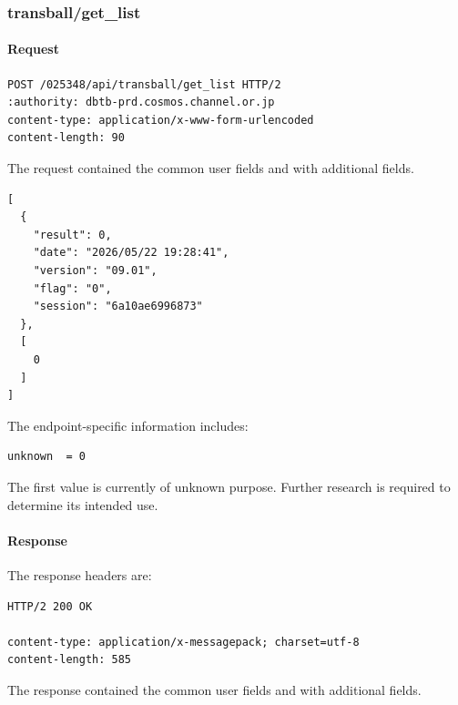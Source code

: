 \subsubsection{transball/get\_list}
\label{subsec:api_transball_get_list}

\paragraph{Request}

\begin{lstlisting}
POST /025348/api/transball/get_list HTTP/2
:authority: dbtb-prd.cosmos.channel.or.jp
content-type: application/x-www-form-urlencoded
content-length: 90
\end{lstlisting}

The request contained the common user fields and with additional fields.

\begin{lstlisting}
[
  {
    "result": 0,
    "date": "2026/05/22 19:28:41",
    "version": "09.01",
    "flag": "0",
    "session": "6a10ae6996873"
  },
  [
    0
  ]
]
\end{lstlisting}

The endpoint-specific information includes:

\begin{lstlisting}
unknown  = 0
\end{lstlisting}

\begin{tcolorbox}[colback=yellow!10,colframe=orange!80!black,title=Warning]
The first value is currently of unknown purpose.
Further research is required to determine its intended use.
\end{tcolorbox}

\newpage

\paragraph{Response}

The response headers are:

\begin{lstlisting}
HTTP/2 200 OK

content-type: application/x-messagepack; charset=utf-8
content-length: 585
\end{lstlisting}

The response contained the common user fields and with additional fields.

